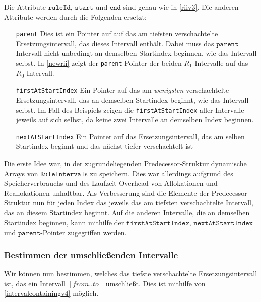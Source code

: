 Die Attribute $\texttt{ruleId}$, $\texttt{start}$ und $\texttt{end}$ sind genau wie in \autoref{riiv3}. Die anderen Attribute werden durch die Folgenden ersetzt:

\begin{itemize}[leftmargin=3cm]
    \item[\texttt{parent}] Dies ist ein Pointer auf auf das am tiefsten verschachtelte Ersetzungsintervall, das dieses Intervall enthält. Dabei muss das $\texttt{parent}$ Intervall nicht unbedingt an demselben Startindex beginnen, wie das Intervall selbst. In \autoref{newrii} zeigt der \texttt{parent}-Pointer der beiden $R_1$ Intervalle auf das $R_0$ Intervall.
    \item[\texttt{firstAtStartIndex}] Ein Pointer auf das am \emph{wenigsten} verschachtelte Ersetzungsintervall, das an demselben Startindex beginnt, wie das Intervall selbst. Im Fall des Beispiels zeigen die \texttt{firstAtStartIndex} aller Intervalle jeweils auf sich selbst, da keine zwei Intervalle an demselben Index beginnen.
    \item[\texttt{nextAtStartIndex}] Ein Pointer auf das Ersetzungsintervall, das am selben Startindex beginnt und das nächst-tiefer verschachtelt ist
\end{itemize}

Die erste Idee war, in der zugrundeliegenden Predecessor-Struktur dynamische Arrays von $\texttt{RuleInterval}$s zu speichern. Dies war allerdings aufgrund des Speicherverbrauchs und des Laufzeit-Overhead von Allokationen und Reallokationen unhaltbar. Als Verbesserung sind die Elemente der Predecessor Struktur nun für jeden Index das jeweils das am tiefsten verschachtelte Intervall, das an diesem Startindex beginnt. Auf die anderen Intervalle, die an demselben Startindex beginnen, kann mithilfe der $\texttt{firstAtStartIndex}$, $\texttt{nextAtStartIndex}$ und $\texttt{parent}$-Pointer zugegriffen werden.

\subsubsection{Bestimmen der umschließenden Intervalle}

Wir können nun bestimmen, welches das tiefste verschachtelte Ersetzungsintervall ist, das ein Intervall $[from..to]$ umschließt.
Dies ist mithilfe von \autoref{intervalcontainingv4} möglich.

